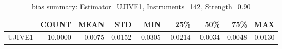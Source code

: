 \begin{table}[ht]
\centering
\caption{bias summary: Estimator=UJIVE1, Instruments=142, Strength=0.90}
\begin{tabular}{lrrrrrrrr}
\toprule
 & COUNT & MEAN & STD & MIN & 25\% & 50\% & 75\% & MAX \\
\midrule
UJIVE1 & 10.0000 & -0.0075 & 0.0152 & -0.0305 & -0.0214 & -0.0034 & 0.0048 & 0.0130 \\
\bottomrule
\end{tabular}
\end{table}
